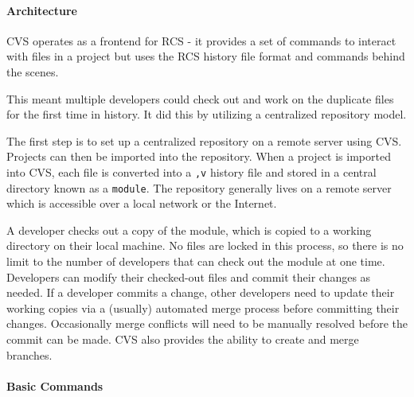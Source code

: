 \paragraph{Architecture}
CVS operates as a frontend for RCS - it provides a set of commands to interact with files in a project but uses the RCS history file format and commands behind the scenes.

This meant multiple developers could check out and work on the duplicate files for the first time in history. It did this by utilizing a centralized repository model.

The first step is to set up a centralized repository on a remote server using CVS. Projects can then be imported into the repository. When a project is imported into CVS, each file is converted into a \lstinline{,v} history file and stored in a central directory known as a \lstinline{module}. The repository generally lives on a remote server which is accessible over a local network or the Internet.

A developer checks out a copy of the module, which is copied to a working directory on their local machine. No files are locked in this process, so there is no limit to the number of developers that can check out the module at one time. Developers can modify their checked-out files and commit their changes as needed. If a developer commits a change, other developers need to update their working copies via a (usually) automated merge process before committing their changes. Occasionally merge conflicts will need to be manually resolved before the commit can be made. CVS also provides the ability to create and merge branches.

\paragraph{Basic Commands}


